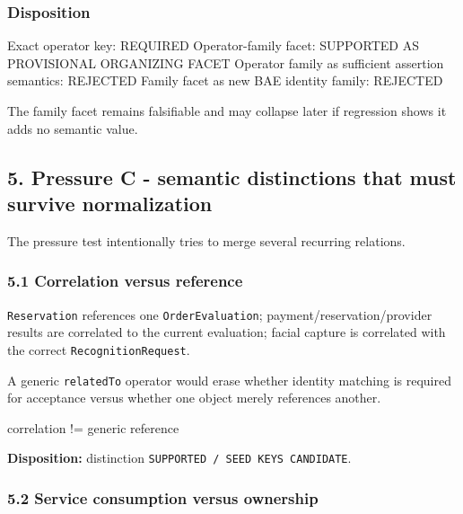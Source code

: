 \documentclass[
  10pt,
  letterpaper,
]{article}
\newenvironment{Shaded}{}{}
\newcommand{\NormalTok}[1]{#1}
\begin{document}
\subsubsection{Disposition}\label{disposition-1}

\begin{Shaded}
\begin{Highlighting}[]
\NormalTok{Exact operator key: REQUIRED}
\NormalTok{Operator{-}family facet: SUPPORTED AS PROVISIONAL ORGANIZING FACET}
\NormalTok{Operator family as sufficient assertion semantics: REJECTED}
\NormalTok{Family facet as new BAE identity family: REJECTED}
\end{Highlighting}
\end{Shaded}

The family facet remains falsifiable and may collapse later if
regression shows it adds no semantic value.

\subsection{5. Pressure C - semantic distinctions that must survive
normalization}\label{pressure-c---semantic-distinctions-that-must-survive-normalization}

The pressure test intentionally tries to merge several recurring
relations.

\subsubsection{5.1 Correlation versus
reference}\label{correlation-versus-reference}

\texttt{Reservation} references one \texttt{OrderEvaluation};
payment/reservation/provider results are correlated to the current
evaluation; facial capture is correlated with the correct
\texttt{RecognitionRequest}.

A generic \texttt{relatedTo} operator would erase whether identity
matching is required for acceptance versus whether one object merely
references another.

\begin{Shaded}
\begin{Highlighting}[]
\NormalTok{correlation != generic reference}
\end{Highlighting}
\end{Shaded}

\textbf{Disposition:} distinction
\texttt{SUPPORTED\ /\ SEED\ KEYS\ CANDIDATE}.

\subsubsection{5.2 Service consumption versus
ownership}\label{service-consumption-versus-ownership}
\end{document}
